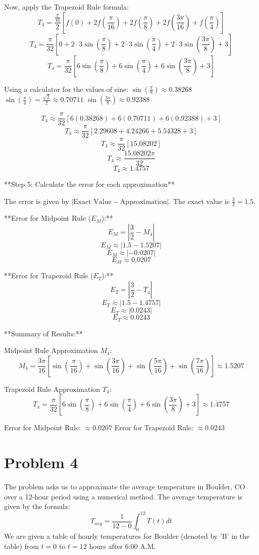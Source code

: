 \documentclass{article}
\begin{document}
Now, apply the Trapezoid Rule formula:
$$ T_4 = \frac{\frac{\pi}{16}}{2} \left[ f(0) + 2f\left(\frac{\pi}{16}\right) + 2f\left(\frac{\pi}{8}\right) + 2f\left(\frac{3\pi}{16}\right) + f\left(\frac{\pi}{4}\right) \right] $$
$$ T_4 = \frac{\pi}{32} \left[ 0 + 2 \cdot 3\sin\left(\frac{\pi}{8}\right) + 2 \cdot 3\sin\left(\frac{\pi}{4}\right) + 2 \cdot 3\sin\left(\frac{3\pi}{8}\right) + 3 \right] $$
$$ T_4 = \frac{\pi}{32} \left[ 6\sin\left(\frac{\pi}{8}\right) + 6\sin\left(\frac{\pi}{4}\right) + 6\sin\left(\frac{3\pi}{8}\right) + 3 \right] $$

Using a calculator for the values of sine:
$\sin\left(\frac{\pi}{8}\right) \approx 0.38268$
$\sin\left(\frac{\pi}{4}\right) = \frac{\sqrt{2}}{2} \approx 0.70711$
$\sin\left(\frac{3\pi}{8}\right) \approx 0.92388$

$$ T_4 \approx \frac{\pi}{32} [6(0.38268) + 6(0.70711) + 6(0.92388) + 3] $$
$$ T_4 \approx \frac{\pi}{32} [2.29608 + 4.24266 + 5.54328 + 3] $$
$$ T_4 \approx \frac{\pi}{32} [15.08202] $$
$$ T_4 \approx \frac{15.08202\pi}{32} $$
$$ T_4 \approx 1.4757 $$

**Step 5: Calculate the error for each approximation**

The error is given by $| \text{Exact Value} - \text{Approximation} |$. The exact value is $\frac{3}{2} = 1.5$.

**Error for Midpoint Rule ($E_M$):**
$$ E_M = \left| \frac{3}{2} - M_4 \right| $$
$$ E_M \approx |1.5 - 1.5207| $$
$$ E_M \approx |-0.0207| $$
$$ E_M \approx 0.0207 $$

**Error for Trapezoid Rule ($E_T$):**
$$ E_T = \left| \frac{3}{2} - T_4 \right| $$
$$ E_T \approx |1.5 - 1.4757| $$
$$ E_T \approx |0.0243| $$
$$ E_T \approx 0.0243 $$

**Summary of Results:**

Midpoint Rule Approximation $M_4$:
$$ M_4 = \frac{3\pi}{16} \left[ \sin\left(\frac{\pi}{16}\right) + \sin\left(\frac{3\pi}{16}\right) + \sin\left(\frac{5\pi}{16}\right) + \sin\left(\frac{7\pi}{16}\right) \right] \approx 1.5207 $$

Trapezoid Rule Approximation $T_4$:
$$ T_4 = \frac{\pi}{32} \left[ 6\sin\left(\frac{\pi}{8}\right) + 6\sin\left(\frac{\pi}{4}\right) + 6\sin\left(\frac{3\pi}{8}\right) + 3 \right] \approx 1.4757 $$

Error for Midpoint Rule: $\approx 0.0207$
Error for Trapezoid Rule: $\approx 0.0243$

\newpage

\section*{Problem 4}
The problem asks us to approximate the average temperature in Boulder, CO over a 12-hour period using a numerical method. The average temperature is given by the formula:
$$T_{avg} = \frac{1}{12-0} \int_0^{12} T(t) dt$$
We are given a table of hourly temperatures for Boulder (denoted by 'B' in the table) from $t=0$ to $t=12$ hours after 6:00 A.M.
\end{document}
